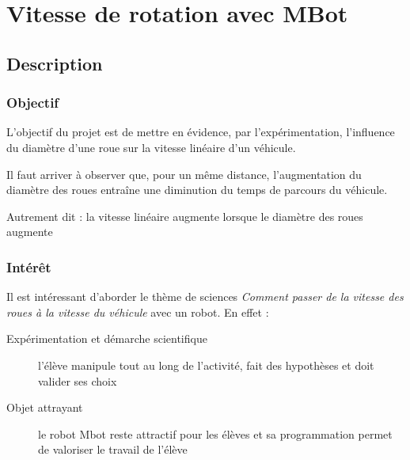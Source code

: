 \section{Vitesse de rotation avec MBot}


%
\pagestyle{mbot} %

\subsection{Description}

\subsubsection{Objectif}


\begin{formule}
L'objectif du projet est de mettre en évidence, par l'expérimentation, l'influence du diamètre d'une roue sur la vitesse linéaire d'un véhicule.

Il faut arriver à observer que, pour un même distance,  l'augmentation du diamètre des roues entraîne une diminution du temps de parcours du véhicule.

Autrement dit : la vitesse linéaire augmente lorsque le diamètre des roues augmente
\end{formule}


\subsubsection{Intérêt}

Il est intéressant d'aborder le thème de sciences \textit{Comment passer de la vitesse des roues à la vitesse du véhicule} avec un robot. En effet :

\begin{description}
    \item [Expérimentation et démarche scientifique] l'élève manipule tout au long de l'activité, fait des hypothèses et doit valider ses choix
    \item [Objet attrayant] le robot Mbot reste attractif pour les élèves et sa programmation permet de valoriser le travail de l'élève
\end{description}


